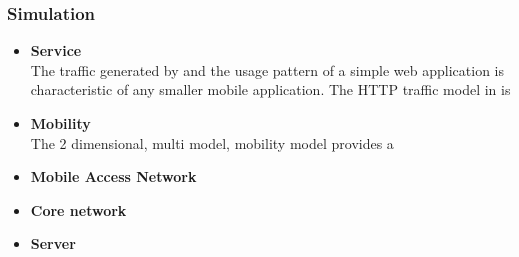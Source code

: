 \subsubsection{Simulation}
\begin{itemize}
\item \textbf{Service}\\
The traffic generated by and the usage pattern of a simple web application is characteristic of any smaller mobile application. The HTTP traffic model in \cite{liu2001traffic} is 

\item \textbf{Mobility}\\
The 2 dimensional, multi model, mobility model \cite{bettstetter2001smooth} provides a 
\item \textbf{Mobile Access Network}\\

\item \textbf{Core network}\\

\item \textbf{Server}\\

\end{itemize}